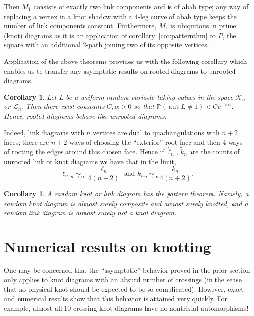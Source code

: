 \documentclass[amsmath,longbibliography,secnumarabic,floatfix,amssymb,nofootinbib,nobibnotes,letterpaper,11pt,notitlepage,tightenlines]{revtex4-1}
\newcommand{\KnotDia}{\mathcal{K}}
\newcommand{\LinkDia}{\mathcal{L}}
\newcommand{\Prb}{\mathbb{P}}
\DeclareMathOperator{\Aut}{aut}
\newtheorem{corollary}[theorem]{Corollary}
\begin{document}
Then $M_1$ consists of exactly two link components and is of abab
type; any way of replacing a vertex in a knot shadow with a 4-leg
curve of abab type keeps the number of link components
constant. Furthermore, $M_1$ is ubiquitous in prime (knot) diagrams as
it is an application of corollary~\ref{cor:patternthm} to $P$, the
square with an additional 2-path joining two of its opposite vertices.

Application of the above theorems provides us with the following corollary which enables us to
transfer any asymptotic results on rooted diagrams to unrooted diagrams.

\begin{corollary}
  Let $L$ be a uniform random variable taking values in the space $\KnotDia_n$ or $\LinkDia_n$. Then
  there exist constants $C, \alpha > 0$ so that $\Prb(\Aut L \ne 1) < Ce^{-\alpha n}$. Hence, rooted
  diagrams behave like unrooted diagrams.
\end{corollary}

Indeed, link diagrams with $n$ vertices are dual to quadrangulations with $n+2$ faces; there are
$n+2$ ways of choosing the ``exterior'' root face and then $4$ ways of rooting the edges around this
chosen face. Hence if $\tilde \ell_n$, $\tilde k_n$ are the counts of unrooted link or knot diagrams
we have that in the limit,
\[ \tilde\ell_n \underset{n\to\infty}{\sim} \frac{\ell_n}{4(n+2)} \text{ and } \tilde k_n
\underset{n\to\infty}{\sim} \frac{k_n}{4(n+2)}.\]

\begin{corollary}
  A random knot or link diagram has the pattern theorem. Namely, a random knot diagram is almost
  surely composite and almost surely knotted, and a random link diagram is almost surely not a knot
  diagram.
\end{corollary}

\section{Numerical results on knotting}
\label{sec:randres}

One may be concerned that the ``asymptotic'' behavior proved in the prior section only applies to
knot diagrams with an absurd number of crossings (in the sense that no physical knot should be
expected to be so complicated). However, exact and numerical results show that this behavior is
attained very quickly. For example, almost all 10-crossing knot diagrams have no nontrivial
automorphisms!


\end{document}

